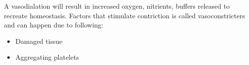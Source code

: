 A vasodialation will result in increased oxygen, nitrients, buffers released to recreate homeostasis.
Factors that stimulate contriction is called vasoconstricters and can happen due to following:\cite{martini2012} 

\begin{itemize}
	\item Damaged tissue
	\item Aggregating platelets 
\end{itemize}




